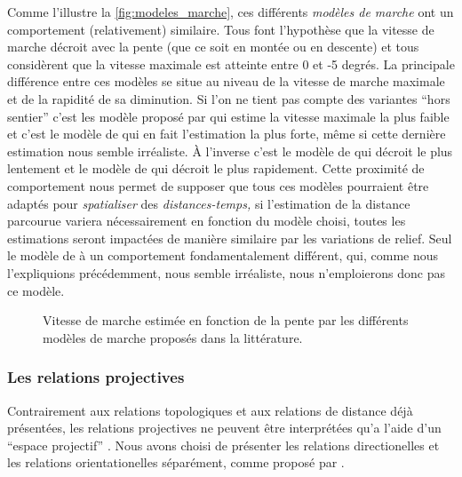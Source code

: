 Comme l'illustre la \autoref{fig:modeles_marche}, ces différents
\emph{modèles de marche} ont un comportement (relativement)
similaire. Tous font l'hypothèse que la vitesse de marche décroit avec
la pente (que ce soit en montée ou en descente) et tous considèrent
que la vitesse maximale est atteinte entre 0 et -5 degrés. La
principale différence entre ces modèles se situe au niveau de la
vitesse de marche maximale et de la rapidité de sa diminution. Si l'on
ne tient pas compte des variantes \enquote{hors sentier} c'est les
modèle proposé par \textcite{Irmischer2017} qui estime la vitesse
maximale la plus faible et c'est le modèle de 
qui en fait l'estimation la plus forte, même si cette dernière
estimation nous semble irréaliste. À l'inverse c'est le modèle de
\textcite{Irmischer2017} qui décroit le plus lentement et le modèle de
\textcite{Tobler1993} qui décroit le plus rapidement. Cette proximité
de comportement nous permet de supposer que tous ces modèles
pourraient être adaptés pour \emph{spatialiser} des
\emph{distances-temps,} si l'estimation de la distance parcourue
variera nécessairement en fonction du modèle choisi, toutes les
estimations seront impactées de manière similaire par les variations
de relief. Seul le modèle de  à un comportement
fondamentalement différent, qui, comme nous l'expliquions
précédemment, nous semble irréaliste, nous n’emploierons donc pas ce
modèle.

\begin{figure}
  \centering
  
  \caption{Vitesse de marche estimée en fonction de la pente par les
    différents modèles de marche proposés dans la littérature.}
  \label{fig:modeles_marche}
\end{figure}


\subsubsection{Les relations projectives}

Contrairement aux relations topologiques et aux relations de distance
déjà présentées, les relations projectives ne peuvent être
interprétées qu'a l'aide d'un \enquote{espace projectif}
\autocite{Duchene2019}. Nous avons choisi de présenter les relations
directionelles et les relations orientationelles séparément, comme
proposé par \textcite{Duchene2019}.



